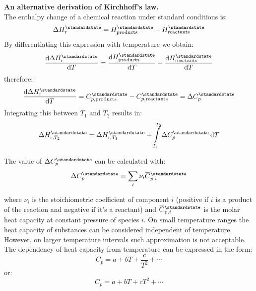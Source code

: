 \documentclass[12pt,a4paper]{report}
\newcommand*\diff{\mathop{}\!\mathrm{d}}
\newcommand{\overbar}[1]{\mkern 1.5mu\overline{\mkern-1.5mu#1\mkern-1.5mu}\mkern 1.5mu}
\begin{document}
\begin{mdframed}
\textbf{An alternative derivation of Kirchhoff's law.}\\
   The enthalpy change of a chemical reaction under standard conditions is:
   \begin{equation*}
   \Delta H^{\standardstate}_{\mathrm{r}}=H^{\standardstate}_{\mathrm{products}}-H^{\standardstate}_{\mathrm{reactants}}
   \end{equation*}
   By differentiating this expression with temperature we obtain:
   \begin{equation*}
   \frac{\diff\Delta H^{\standardstate}_{\mathrm{r}}}{\diff T}=\frac{\diff H^{\standardstate}_{\mathrm{products}}}{\diff T}-\frac{\diff H^{\standardstate}_{\mathrm{reactants}}}{\diff T}
   \end{equation*}
   therefore:
   \begin{equation*}
   \frac{\diff\Delta H^{\standardstate}_{\mathrm{r}}}{\diff T}=C^{\standardstate}_{p,\mathrm{products}}-C^{\standardstate}_{p,\mathrm{reactants}}=\Delta C^{\standardstate}_{p}
   \end{equation*}
   Integrating this between $T_{1}$ and $T_{2}$ results in:
   \begin{equation*}
   \Delta H^{\standardstate}_{\mathrm{r},T_{2}}=\Delta H^{\standardstate}_{\mathrm{r},T_{1}}+\int\limits_{T_{1}}^{T_{2}}\Delta C^{\standardstate}_{p}\diff T
   \end{equation*}
\end{mdframed}
   The value  of $\Delta C^{\standardstate}_{p}$ can be calculated with:
   \begin{equation*}
   \Delta C^{\standardstate}_{p}=\sum\limits_{i}\nu_{i}\overbar{C}^{\standardstate}_{p,i}
   \end{equation*}

   where $\nu_{i}$ is the stoichiometric coefficient of component $i$ (positive if $i$ is a product of the reaction and negative if it's a reactant) and $\overbar{C}^{\standardstate}_{\mathrm{p},i}$ is the molar heat capacity at constant pressure of species $i$.
   On small temperature ranges the heat capacity of substances can be considered independent of temperature. However, on larger temperature intervals such approximation is not acceptable. The dependency of heat capacity from temperature can be expressed in the form:
  \begin{equation*}
  C_{p}=a+bT+\frac{c}{T^{2}}+\cdots
  \end{equation*}
  or:
    \begin{equation*}
  C_{p}=a+bT+cT^{2}+\cdots
  \end{equation*}
\end{document}
